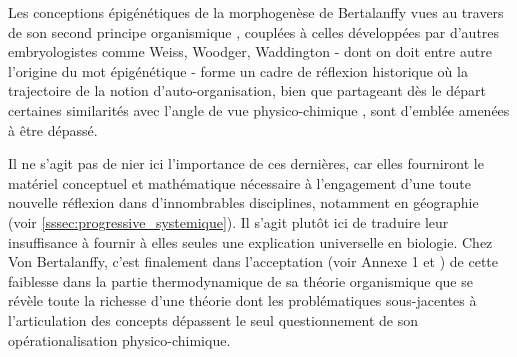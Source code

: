 

Les conceptions épigénétiques de la morphogenèse de Bertalanffy vues au travers de son second principe organismique , couplées à celles développées par d'autres embryologistes comme Weiss, Woodger, Waddington - dont on doit entre autre l'origine du mot épigénétique -  forme un cadre de réflexion historique où la trajectoire de la notion d'auto-organisation, bien que partageant dès le départ certaines similarités avec l'angle de vue physico-chimique \autocite{Prigogine1946}, sont d'emblée amenées à être dépassé.

Il ne s'agit pas de nier ici l'importance de ces dernières, car elles fourniront le matériel conceptuel et mathématique nécessaire à l'engagement d'une toute nouvelle réflexion dans d'innombrables disciplines, notamment en géographie (voir \ref{sssec:progressive_systemique}). Il s'agit plutôt ici de traduire leur insuffisance à fournir à elles seules une explication universelle en biologie. Chez Von Bertalanffy, c'est finalement dans l’acceptation (voir Annexe 1 et \autocite[657-661]{Pouvreau2013}) de cette faiblesse dans la partie thermodynamique de sa théorie organismique que se révèle toute la richesse d'une théorie dont les problématiques sous-jacentes à l'articulation des concepts dépassent le seul questionnement de son opérationalisation physico-chimique.


